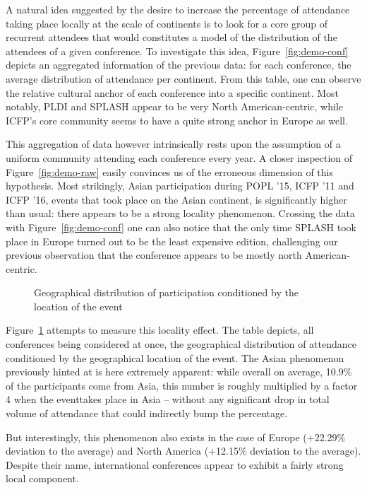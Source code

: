 \documentclass[manuscript, review, screen]{acmart}
\newcommand{\event}{event} %
\newcommand{\conf}{conference}
\begin{document}
A natural idea suggested by the desire to increase the percentage of attendance
taking place locally at the scale of continents is to look for a core group of
recurrent attendees that would constitutes a model of the distribution of the
attendees of a given conference. To investigate this idea, Figure~\ref{fig:demo-conf}
depicts an aggregated information of the previous data: for each 
\conf, the average distribution of attendance per continent. From this
table, one can observe the relative cultural anchor of each conference into a
specific continent. Most notably, PLDI and SPLASH appear to be very North
American-centric, while ICFP's core community seems to have a quite strong
anchor in Europe as well.

This aggregation of data however intrinsically rests upon the assumption of a uniform
community attending each conference every year. A closer inspection of
Figure~\ref{fig:demo-raw} easily convinces us of the erroneous dimension of this
hypothesis. Most strikingly, Asian participation during POPL '15, ICFP '11 and
ICFP '16, events that took place on the Asian continent, is significantly higher
than usual: there appears to be a strong locality phenomenon. Crossing the data with
Figure~\ref{fig:demo-conf} one can also notice that the only time SPLASH took
place in Europe turned out to be the least expensive edition, challenging our previous
observation that the conference appears to be mostly north American-centric.

\begin{figure}
\caption{Geographical distribution of participation conditioned by the location of the \event}
\label{fig:local_effect}
\end{figure}

Figure~\ref{fig:local_effect} attempts to measure this locality effect. The
table depicts, all conferences being considered at once, the geographical
distribution of attendance conditioned by the geographical location of the
\event. The Asian phenomenon previously hinted at is here extremely
apparent: while overall on average, 10.9\% of the participants come from Asia,
this number is roughly multiplied by a factor 4 when the \event takes place in Asia --
without any significant drop in total volume of attendance that could indirectly bump
the percentage.

But interestingly, this phenomenon also exists in the case of Europe (+22.29\%
deviation to the average) and North America (+12.15\% deviation to the average).
Despite their name, international conferences appear to exhibit a fairly strong
local component.
\end{document}

